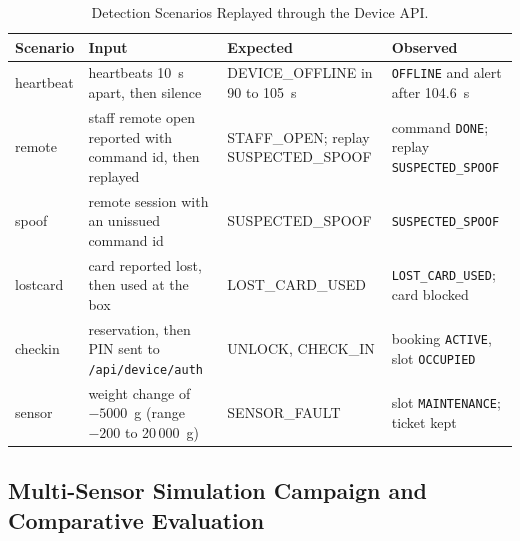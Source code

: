 \documentclass[journal,onecolumn]{IEEEtran}
\begin{document}
\begin{table}[!htbp]
\renewcommand{\arraystretch}{1.12}
\centering
\small
\caption{Detection Scenarios Replayed through the Device API.}
\label{tab:scen}
\vspace{3pt}
\begin{tabular}{l >{\raggedright\arraybackslash}p{4.8cm} >{\raggedright\arraybackslash}p{3.6cm} >{\raggedright\arraybackslash}p{5.2cm}}
\hline
Scenario & Input & Expected & Observed \\
\midrule
\addlinespace[2pt]
heartbeat & 6 heartbeats 10~s apart, then silence & DEVICE\_OFFLINE in 90 to 105~s & \texttt{OFFLINE} and alert after 104.6~s \\[2pt]
remote    & staff remote open reported with command id, then replayed & STAFF\_OPEN; replay SUSPECTED\_SPOOF & command \texttt{DONE}; replay \texttt{SUSPECTED\_SPOOF} \\[2pt]
spoof     & remote session with an unissued command id & SUSPECTED\_SPOOF & \texttt{SUSPECTED\_SPOOF} \\[2pt]
lostcard  & card reported lost, then used at the box & LOST\_CARD\_USED & \texttt{LOST\_CARD\_USED}; card blocked \\[2pt]
checkin   & reservation, then PIN sent to \texttt{/api/device/auth} & UNLOCK, CHECK\_IN & booking \texttt{ACTIVE}, slot \texttt{OCCUPIED} \\[2pt]
sensor    & weight change of $-5000$~g (range $-200$ to 20\,000~g) & SENSOR\_FAULT & slot \texttt{MAINTENANCE}; ticket kept \\
\hline
\end{tabular}
\end{table}

\subsection{Multi-Sensor Simulation Campaign and Comparative Evaluation}
\label{sec:sim_eval}
\end{document}
